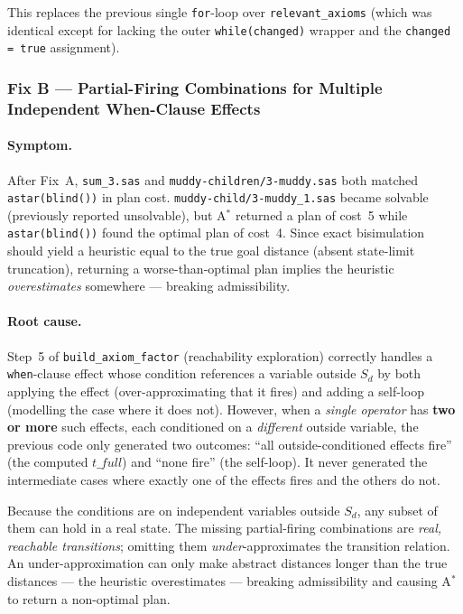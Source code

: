 \documentclass[11pt,a4paper]{article}
\begin{document}
This replaces the previous single \texttt{for}-loop over
\texttt{relevant\_axioms} (which was identical except for lacking the outer
\texttt{while(changed)} wrapper and the \texttt{changed = true} assignment).

\subsubsection{Fix B — Partial-Firing Combinations for Multiple Independent
When-Clause Effects}
\label{sec:fix-b}

\paragraph{Symptom.}
After Fix~A, \texttt{sum\_3.sas} and \texttt{muddy-children/3-muddy.sas}
both matched \texttt{astar(blind())} in plan cost.
\texttt{muddy-child/3-muddy\_1.sas} became solvable (previously reported
unsolvable), but A$^*$ returned a plan of cost~5 while
\texttt{astar(blind())} found the optimal plan of cost~4.  Since exact
bisimulation should yield a heuristic equal to the true goal distance
(absent state-limit truncation), returning a worse-than-optimal plan implies
the heuristic \emph{overestimates} somewhere --- breaking admissibility.

\paragraph{Root cause.}
Step~5 of \texttt{build\_axiom\_factor} (reachability exploration) correctly
handles a \texttt{when}-clause effect whose condition references a variable
outside $S_d$ by both applying the effect (over-approximating that it fires)
and adding a self-loop (modelling the case where it does not).  However,
when a \emph{single operator} has \textbf{two or more} such effects, each
conditioned on a \emph{different} outside variable, the previous code only
generated two outcomes: ``all outside-conditioned effects fire'' (the
computed $t\_full$) and ``none fire'' (the self-loop).  It never generated
the intermediate cases where exactly one of the effects fires and the others
do not.

Because the conditions are on independent variables outside $S_d$, any
subset of them can hold in a real state.  The missing partial-firing
combinations are \emph{real, reachable transitions}; omitting them
\emph{under}-approximates the transition relation.  An
under-approximation can only make abstract distances longer than the true
distances --- the heuristic overestimates --- breaking admissibility and
causing A$^*$ to return a non-optimal plan.
\end{document}
